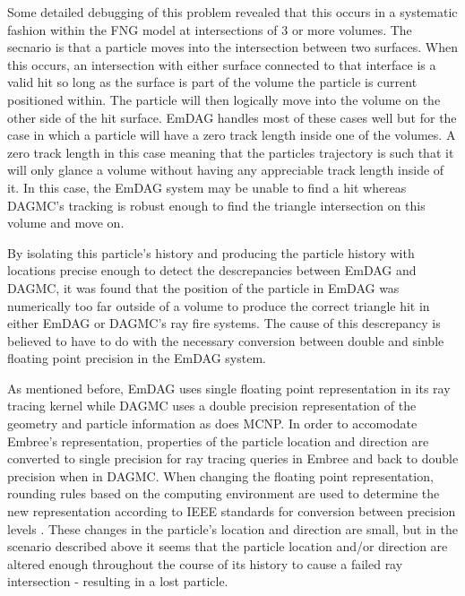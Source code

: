 \documentclass[12pt, a4paper]{article}
\begin{document}
Some detailed debugging of this problem revealed that this occurs in a systematic fashion within the FNG model at intersections of 3 or more volumes. The secnario is that a particle moves into the intersection between two surfaces. When this occurs, an intersection with either surface connected to that interface is a valid hit so long as the surface is part of the volume the particle is current positioned within. The particle will then logically move into the volume on the other side of the hit surface. EmDAG handles most of these cases well but for the case in which a particle will have a zero track length inside one of the volumes. A zero track length in this case meaning that the particles trajectory is such that it will only glance a volume without having any appreciable track length inside of it. In this case, the EmDAG system may be unable to find a hit whereas DAGMC's tracking is robust enough to find the triangle intersection on this volume and move on.

By isolating this particle's history and producing the particle history with locations precise enough to detect the descrepancies between EmDAG and DAGMC, it was found that the position of the particle in EmDAG was numerically too far outside of a volume to produce the correct triangle hit in either EmDAG or DAGMC's ray fire systems. The cause of this descrepancy is believed to have to do with the necessary conversion between double and sinble floating point precision in the EmDAG system.

As mentioned before, EmDAG uses single floating point representation in its ray tracing kernel while DAGMC uses a double precision representation of the geometry and particle information as does MCNP. In order to accomodate Embree's representation, properties of the particle location and direction are converted to single precision for ray tracing queries in Embree and back to double precision when in DAGMC. When changing the floating point representation, rounding rules based on the computing environment are used to determine the new representation according to IEEE standards for conversion between precision levels \cite{IEEE_STD_2008}. These changes in the particle's location and direction are small, but in the scenario described above it seems that the particle location and/or direction are altered enough throughout the course of its history to cause a failed ray intersection - resulting in a lost particle.
\end{document}
